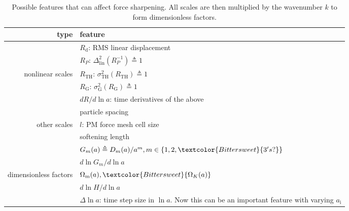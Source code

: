 \documentclass[modern, trackchanges, dvipsnames]{aastex631}
\renewcommand{\d}{d}
\newcommand{\lna}{\ln\!a}
\newcommand{\Omegam}{\Omega_\mathrm{m}}
\newcommand{\OmegaK}{\Omega_K}
\newcommand{\ic}{\mathrm{i}}
\newcommand{\linear}{\mathrm{lin}}
\newcommand{\tophat}{\mathrm{TH}}
\newcommand{\gauss}{\mathrm{G}}
\newcommand{\YL}[1]{\textcolor{Bittersweet}{#1}}
\begin{document}
\begin{table}
  \centering
  \caption{Possible features that can affect force sharpening.
  All scales are then multiplied by the wavenumber $k$ to form dimensionless
  factors.}
  \label{tab:feat}
  \begin{tabular}{rl}
  \toprule
  type & feature \\
  \midrule
  & $R_\mathrm{d}$: RMS linear displacement \\
  \cmidrule(lr){2-2}
  & $R_P$: $\Delta_\linear^2(R_P^{-1}) \triangleq 1$ \\
  \cmidrule(lr){2-2}
  nonlinear scales & $R_\tophat$: $\sigma_\tophat^2(R_\tophat) \triangleq 1$ \\
  \cmidrule(lr){2-2}
  & $R_\gauss$: $\sigma_\gauss^2(R_\gauss) \triangleq 1$ \\
  \cmidrule(lr){2-2}
  & $\d R / \d\lna$: time derivatives of the above \\
  \midrule
  & particle spacing \\
  \cmidrule(lr){2-2}
  other scales & $l$: PM force mesh cell size \\
  \cmidrule(lr){2-2}
  & softening length \\
  \midrule
  & $G_m(a) \triangleq D_m(a) / a^m, m \in \{1, 2, \YL{3's?}\}$ \\
  \cmidrule(lr){2-2}
  & $\d\ln G_m / \d\lna$ \\
  \cmidrule(lr){2-2}
  dimensionless factors & $\Omegam(a), \YL{\OmegaK(a)}$ \\
  \cmidrule(lr){2-2}
  & $\d\ln\!H / \d\lna$ \\
  \cmidrule(lr){2-2}
  & $\Delta\lna$: time step size in $\lna$\YL{. Now this can be an important feature with varying $a_\ic$}\\
  \bottomrule
  \end{tabular}
  \end{table}
\end{document}
